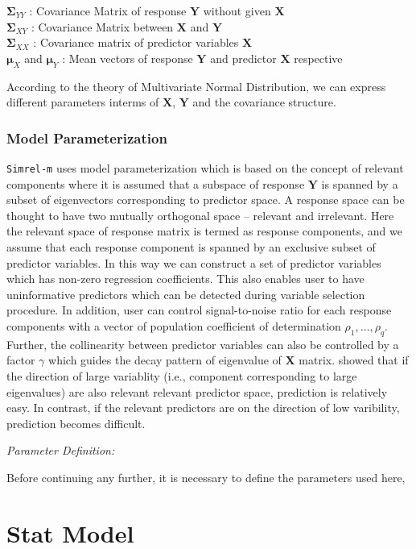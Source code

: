 \documentclass[12pt,a4paperpaper,authoryear]{elsarticle} %
\begin{document}
\(\boldsymbol{\Sigma}_{YY}\) : Covariance Matrix of response
\(\mathbf{Y}\) without given \(\mathbf{X}\)\\
\(\boldsymbol{\Sigma}_{XY}\) : Covariance Matrix between \(\mathbf{X}\)
and \(\mathbf{Y}\)\\
\(\boldsymbol{\Sigma}_{XX}\) : Covariance matrix of predictor variables
\(\mathbf{X}\)\\
\(\boldsymbol{\mu}_X\) and \(\boldsymbol{\mu}_Y\) : Mean vectors of
response \(\mathbf{Y}\) and predictor \(\mathbf{X}\) respective

According to the theory of Multivariate Normal Distribution, we can
express different parameters interms of \(\mathbf{X}\), \(\mathbf{Y}\)
and the covariance structure.

\subsubsection{Model Parameterization}\label{model-parameterization}

\texttt{Simrel-m} uses model parameterization which is based on the
concept of relevant components \citet{helland1994comparison} where it is
assumed that a subspace of response \(\mathbf{Y}\) is spanned by a
subset of eigenvectors corresponding to predictor space. A response
space can be thought to have two mutually orthogonal space -- relevant
and irrelevant. Here the relevant space of response matrix is termed as
response components, and we assume that each response component is
spanned by an exclusive subset of predictor variables. In this way we
can construct a set of predictor variables which has non-zero regression
coefficients. This also enables user to have uninformative predictors
which can be detected during variable selection procedure. In addition,
user can control signal-to-noise ratio for each response components with
a vector of population coefficient of determination
\(\rho_1, \ldots, \rho_q\). Further, the collinearity between predictor
variables can also be controlled by a factor \(\gamma\) which guides the
decay pattern of eigenvalue of \(\mathbf{X}\) matrix.
\citet{helland1994comparison} showed that if the direction of large
variablity (i.e., component corresponding to large eigenvalues) are also
relevant relevant predictor space, prediction is relatively easy. In
contrast, if the relevant predictors are on the direction of low
varibility, prediction becomes difficult.

\emph{Parameter Definition:}

Before continuing any further, it is necessary to define the parameters
used here,

\section{Stat Model}\label{stat-model}


\end{document}
